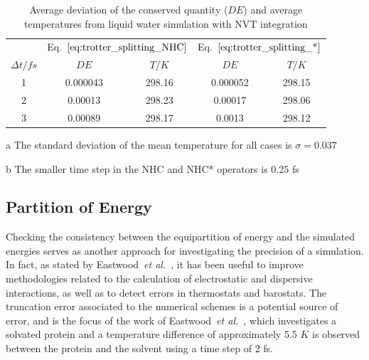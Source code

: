 \documentclass[aip,jcp,reprint,amsmath,amssymb,amsfont]{revtex4-1}
\begin{document}
\begin{table}[h]
\setlength{\tabcolsep}{7pt}
\begin{threeparttable}
\caption{Average deviation of the conserved quantity ($DE$) and average temperatures from liquid water simulation with NVT integration } 
\label{table:denvt}

\centering %
\begin{tabular}{|c c c c c |}  
\hline
& \multicolumn{2}{c}{Eq.~$\ref{eq:trotter_splitting_NHC}$} &\multicolumn{2}{c|}{Eq.~$\ref{eq:trotter_splitting_*}$} \\
\cline{2-5}
$\Delta t/fs$ &$D E$ &$T/K$ &$D E$ &$T/K$\\
\hline %
 1  & 0.000043 & 298.16  & 0.000052  & 298.15 \\

 2  & 0.00013 & 298.23  & 0.00017 & 298.06  \\

 3  & 0.00089 & 298.17  & 0.0013 & 298.12  \\

 \hline
\end{tabular}
\begin{tablenotes}
\item[a] The standard deviation of the mean temperature for all cases is $\sigma = 0.037$
\item[b] The smaller time step in the NHC and NHC* operators is 0.25 fs 
\end{tablenotes}
\end{threeparttable}
\end{table}

\subsection{Partition of Energy}
\label{sec:energypartition}

Checking the consistency between the equipartition of energy and the simulated energies serves as another approach for investigating the precision of a simulation. In fact, as stated by Eastwood~\textit{et al.}~\cite{Eastwood_2010}, it has been useful to improve methodologies related to the calculation of electrostatic\cite{Levitt_1988,Guenot_1992,Arnold_1994} and dispersive\cite{Sagui_1999} interactions, as well as to detect errors in thermostats\cite{Harvey_1998,Mor_2008} and barostats\cite{Feller_1995}. The truncation error associated to the numerical schemes is a potential source of error, and is the focus of the work of Eastwood~\textit{et al.}~\cite{Eastwood_2010}, which investigates a solvated protein and a temperature difference of approximately 5.5 $K$ is observed between the protein and the solvent using a time step of 2 fs.
\end{document}
